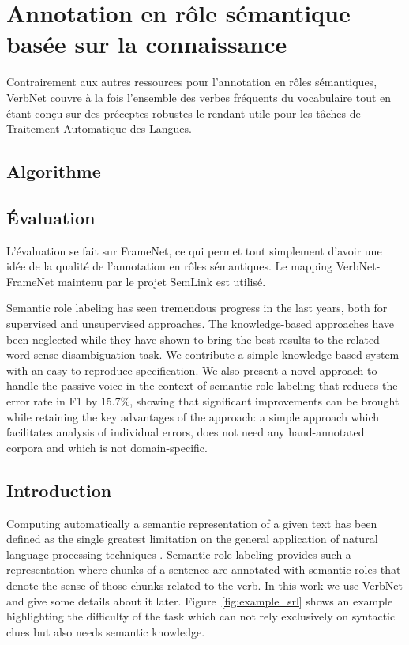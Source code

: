 \chapter{Annotation en rôle sémantique basée sur la connaissance}
\label{ch:srl}


Contrairement aux autres ressources pour l'annotation en rôles sémantiques, VerbNet couvre à la fois l'ensemble des verbes fréquents du vocabulaire tout en étant conçu sur des préceptes robustes le rendant utile pour les tâches de Traitement Automatique des Langues.

\section{Algorithme}

\section{Évaluation}

L'évaluation se fait sur FrameNet, ce qui permet tout simplement d'avoir une idée de la qualité de l'annotation en rôles sémantiques. Le mapping VerbNet-FrameNet maintenu par le projet SemLink est utilisé.


%

Semantic role labeling has seen tremendous progress in the last
years, both for supervised and unsupervised approaches. The knowledge-based
approaches have been neglected while they have shown to bring the best results
to the related word sense disambiguation task. We contribute a simple
knowledge-based system with an easy to reproduce specification. We also present
a novel approach to handle the passive voice in the context of semantic role
labeling that reduces the error rate in F1 by 15.7\%, showing that significant
improvements can be brought while retaining the key advantages of the approach:
a simple approach which facilitates analysis of individual errors, does not
need any hand-annotated corpora and which is not domain-specific.


\section{Introduction}

Computing automatically a semantic representation of a given text has been
defined as the single greatest limitation on the general application of natural
language processing techniques \citep{dang1998investigating}. Semantic role
labeling provides such a representation where chunks of a sentence are
annotated with semantic roles that denote the sense of those chunks related to
the verb. In this work we use VerbNet \citep{kipper2006extending} and give
some details about it later. Figure~\ref{fig:example_srl} shows an example
highlighting the difficulty of the task which can not rely exclusively on
syntactic clues but also needs semantic knowledge.

